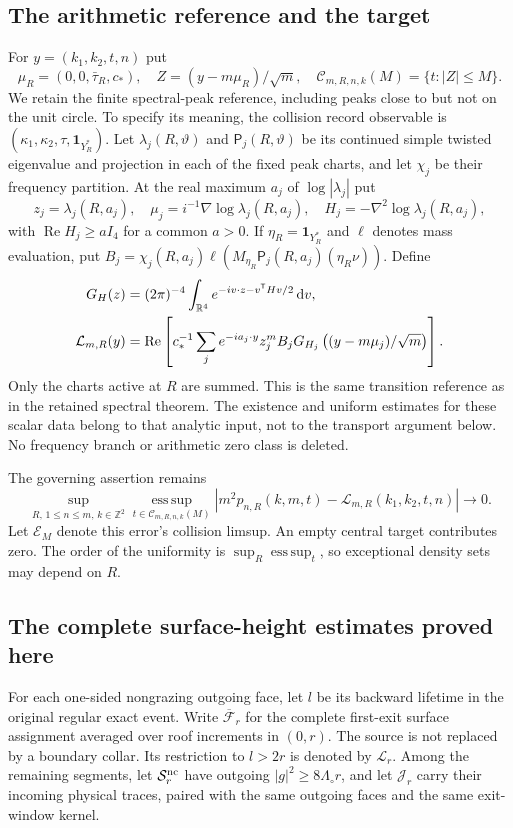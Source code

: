 \documentclass[11pt,reqno]{amsart}
\numberwithin{equation}{section}
\theoremstyle{definition}\newtheorem{definition}[theorem]{Definition}
\theoremstyle{remark}\newtheorem{remark}[theorem]{Remark}
\newcommand{\R}{\mathbb R}\newcommand{\Z}{\mathbb Z}\newcommand{\T}{\mathbb T}
\newcommand{\dd}{\,\mathrm d}\newcommand{\one}{\mathbf1}
\theoremstyle{definition}\newtheorem{inputstatement}[theorem]{Input statement}
\newcommand{\esssup}{\operatorname*{ess\,sup}}
\begin{document}
\subsection{The arithmetic reference and the target}
For $y=(k_1,k_2,t,n)$ put
\[
 \mu_R=(0,0,\bar\tau_R,c_*),\quad
 Z=(y-m\mu_R)/\sqrt m,\quad
 \mathcal C_{m,R,n,k}(M)=\{t:|Z|\le M\}.
\]
We retain the finite spectral-peak reference, including peaks close to
but not on the unit circle. To specify its meaning, the collision
record observable is $(\kappa_1,\kappa_2,\tau,\one_{Y_R^*})$.
Let $\lambda_j(R,\vartheta)$ and $\mathsf P_j(R,\vartheta)$ be its
continued simple twisted eigenvalue and projection in each of the
fixed peak charts, and let $\chi_j$ be their frequency partition.
At the real maximum $a_j$ of $\log|\lambda_j|$ put
\[
 z_j=\lambda_j(R,a_j),\quad
 \mu_j=i^{-1}\nabla\log\lambda_j(R,a_j),\quad
 H_j=-\nabla^2\log\lambda_j(R,a_j),
\]
with $\operatorname{Re}H_j\ge aI_4$ for a common $a>0$. If
$\eta_R=\one_{Y_R^*}$ and $\ell$ denotes mass evaluation, put
$B_j=\chi_j(R,a_j)\ell(M_{\eta_R}\mathsf P_j(R,a_j)(\eta_R\nu))$.
Define
\begin{align}
 G_H(z)&=(2\pi)^{-4}\int_{\R^4}e^{-iv\cdot z-v^{\mathsf T}Hv/2}\dd v,
 \notag\\
 \mathcal L_{m,R}(y)&=\operatorname{Re}\left[
 c_*^{-1}\sum_j e^{-ia_j\cdot y}z_j^m B_j
      G_{H_j}\left((y-m\mu_j)/\sqrt m\right)\right].
 \label{eq:v76-reference}
\end{align}
Only the charts active at $R$ are summed. This is the same transition
reference as in the retained spectral theorem. The existence and
uniform estimates for these scalar data belong to that analytic
input, not to the transport argument below. No frequency branch or
arithmetic zero class is deleted.

The governing assertion remains
\begin{equation}\label{eq:v76-target}
 \sup_{R,\,1\le n\le m,\,k\in\Z^2}
 \esssup_{t\in\mathcal C_{m,R,n,k}(M)}
 |m^2p_{n,R}(k,m,t)-\mathcal L_{m,R}(k_1,k_2,t,n)|\longrightarrow0.
\end{equation}
Let $\mathcal E_M$ denote this error's collision limsup. An empty
central target contributes zero. The order of the uniformity is
$\sup_R\esssup_t$, so exceptional density sets may depend on $R$.

\subsection{The complete surface-height estimates proved here}
For each one-sided nongrazing outgoing face, let $l$ be its backward
lifetime in the original regular exact event. Write
$\overline{\mathcal F}_r$ for the complete first-exit surface assignment
averaged over roof increments in $(0,r)$. The source is not replaced
by a boundary collar. Its restriction to $l>2r$ is denoted by
$\mathcal L_r$. Among the remaining segments, let
$\mathcal S_r^{\rm nc}$ have outgoing $|g|^2\ge8\Lambda_\circ r$,
and let $\mathcal J_r$ carry their incoming physical traces, paired
with the same outgoing faces and the same exit-window kernel.
\end{document}
